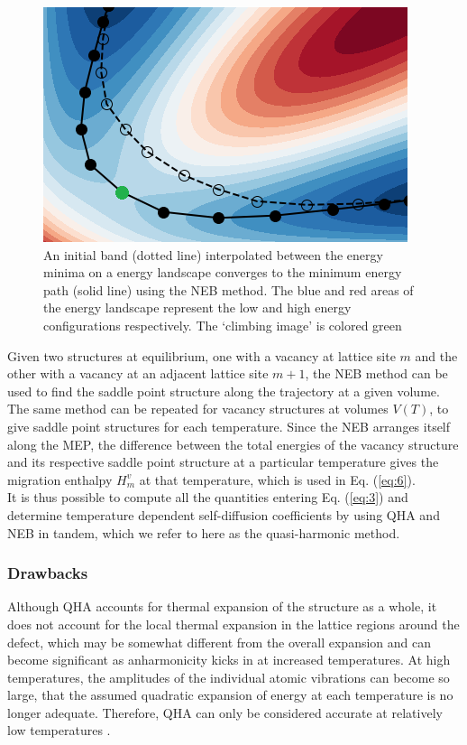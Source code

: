 \documentclass{article}
\begin{document}
\begin{figure}[htp]
\centering
\includegraphics[scale=1.2]{neb}
\caption{An initial band (dotted line) interpolated between the energy minima on a energy landscape converges to the minimum energy path (solid line) using the NEB method. The blue and red areas of the energy landscape represent the low and high energy configurations respectively. The \enquote*{climbing image} is colored green}
 \label{fig:3}
\end{figure}

Given two structures at equilibrium, one with a vacancy at lattice site $m$ and the other with a vacancy at an adjacent lattice site $m+1$, the NEB method can be used to find the saddle point structure along the trajectory at a given volume. The same method can be repeated for vacancy structures at volumes $V(T)$, to give saddle point structures for each temperature. Since the NEB arranges itself along the MEP, the difference between the total energies of the vacancy structure and its respective saddle point structure at a particular temperature gives the migration enthalpy $H^v_m$ at that temperature, which is used in Eq. (\ref{eq:6}). \\

It is thus possible to compute all the quantities entering Eq. (\ref{eq:3}) and determine temperature dependent self-diffusion coefficients by using QHA and NEB in tandem, which we refer to here as the quasi-harmonic method.

\subsubsection{Drawbacks} 

\noindent Although QHA accounts for thermal expansion of the structure as a whole, it does not account for the local thermal expansion in the lattice regions around the defect, which may be somewhat different from the overall expansion and can become significant as anharmonicity kicks in at increased temperatures. At high temperatures, the amplitudes of the individual atomic vibrations can become so large, that the assumed quadratic expansion of energy at each temperature is no longer adequate. Therefore, QHA can only be considered accurate at relatively low temperatures \cite{Mendelev2009}.
\end{document}

